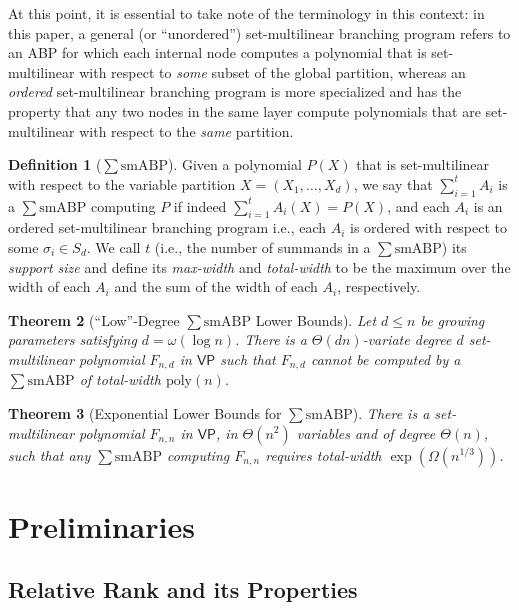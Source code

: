 \documentclass[10pt,a4paper]{article}
\newtheorem{theorem}{Theorem}[section]
\theoremstyle{definition}%
\newtheorem{definition}[theorem]{Definition}
\theoremstyle{plain}
\newcommand{\sbp}{\sum\mathrm{smABP}}
\newcommand{\poly}{\mathrm{poly}}
\newcommand{\VP}{\mathsf{VP}}
\begin{document}
At this point, it is essential to take note of the terminology in this context: in this paper, a general (or ``unordered'') set-multilinear branching program refers to an ABP for which each internal node computes a polynomial that is set-multilinear with respect to \emph{some} subset of the global partition, whereas an \emph{ordered} set-multilinear branching program is more specialized and has the property that any two nodes in the same layer compute polynomials that are set-multilinear with respect to the \emph{same} partition.

\begin{definition}[$\sbp$]\label{def:sum}
Given a polynomial $P(X)$ that is set-multilinear with respect to the variable partition $X = (X_1,\ldots, X_d)$, we say that $\sum_{i=1}^t A_i$ is a $\sbp$ computing $P$ if indeed $\sum_{i=1}^t A_i(X) = P(X)$, and
each $A_i$ is an ordered set-multilinear branching program i.e., each $A_i$ is ordered with respect to some $\sigma_i\in S_d$. We call $t$ (i.e., the number of summands in a $\sbp$) its \emph{support size} and define its \emph{max-width} and \emph{total-width} to be the maximum over the width of each $A_i$ and the sum of the width of each $A_i$, respectively.    
\end{definition}

\begin{theorem}[``Low''-Degree $\sbp$ Lower Bounds]\label{thm:small-deg-VP}
Let $d\leq n$ be growing parameters satisfying $d = \omega(\log n)$. There is a $\Theta(dn)$-variate degree $d$ set-multilinear polynomial $F_{n,d}$ in $\VP$ such that $F_{n,d}$  cannot be computed by a $\sbp$ of total-width $\poly(n)$.
\end{theorem}

\begin{theorem}[Exponential Lower Bounds for $\sbp$]\label{thm:large-deg-VP}
There is a set-multilinear polynomial $F_{n,n}$ in $\VP$, in  $\Theta(n^2)$ variables and of degree $\Theta(n)$, such that any $\sbp$ computing $F_{n,n}$ requires total-width ${\exp(\Omega(n^{1/3}))}$.
\end{theorem}

\section{Preliminaries}\label{sec:prel}
\subsection{Relative Rank and its Properties}
\end{document}
